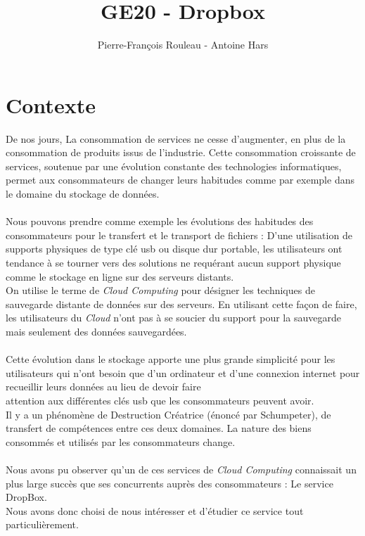 \documentclass[a4paper, 10pt]{article}
\title{GE20 - Dropbox}
\author{Pierre-François Rouleau - Antoine Hars}
\begin{document}
\maketitle

\section*{Contexte}
De nos jours, La consommation de services ne cesse d'augmenter, en plus de la consommation de produits issus de l'industrie.
Cette consommation croissante de services, soutenue par une \'evolution constante des technologies informatiques, permet aux consommateurs
de changer leurs habitudes comme par exemple dans le domaine du stockage de donn\'ees.\\ \\
Nous pouvons prendre comme exemple les \'evolutions des habitudes des consommateurs pour le transfert et le transport de fichiers :
D'une utilisation de supports physiques de type cl\'e usb ou disque dur portable, les utilisateurs ont tendance \`a se tourner vers des solutions
ne requ\'erant aucun support physique comme le stockage en ligne sur des serveurs distants.\\
On utilise le terme de \textit{Cloud Computing} pour d\'esigner les techniques de sauvegarde distante de donn\'ees sur des serveurs.
En utilisant cette façon de faire, les utilisateurs du \textit{Cloud} n'ont pas \`a se soucier du support pour la sauvegarde mais
seulement des donn\'ees sauvegard\'ees.\\ \\
Cette \'evolution dans le stockage apporte une plus grande simplicit\'e pour les utilisateurs
qui n'ont besoin que d'un ordinateur et d'une connexion internet pour recueillir leurs donn\'ees
au lieu de devoir faire\\attention aux diff\'erentes cl\'es usb que les consommateurs peuvent avoir.\\
Il y a un ph\'enom\`ene de Destruction Cr\'eatrice (\'enonc\'e par Schumpeter), de transfert de comp\'etences entre ces deux domaines.
La nature des biens consomm\'es et utilis\'es par les consommateurs change.\\ \\
Nous avons pu observer qu'un de ces services de \textit{Cloud Computing} connaissait un plus large succ\`es
que ses concurrents aupr\`es des consommateurs : Le service DropBox.\\
Nous avons donc choisi de nous int\'eresser et d'\'etudier ce service tout particuli\`erement.\\ \\
\end{document}
